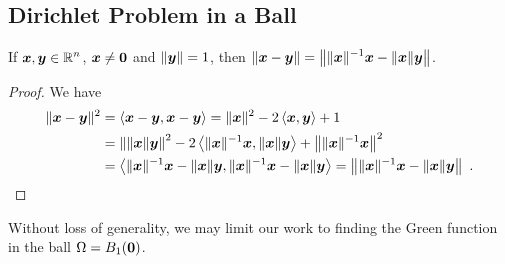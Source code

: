 \subsection{Dirichlet Problem in a Ball}

\begin{lemma} \label{laplace_diric_ball}
If $\displaystyle {\bm{x}}, {\bm{y}} \in \mathbb{R}^n$, ${\bm{x}} \neq {\bm{0}}$ and
$\|{\bm{y}}\|=1$, then
$\displaystyle \|{\bm{x}}-{\bm{y}}\|
= \left\|\|{\bm{x}}\|^{-1} {\bm{x}} - \|{\bm{x}}\| {\bm{y}}\right\|$.
\end{lemma}

\begin{proof}
We have
\begin{align*}
\|{\bm{x}}-{\bm{y}}\|^2 &= \left\langle{{\bm{x}}-{\bm{y}}} , {{\bm{x}}-{\bm{y}}}\right\rangle
= \|{\bm{x}}\|^2 - 2 \left\langle{{\bm{x}}} , {{\bm{y}}}\right\rangle + 1 \\
&= \left\| \|{\bm{x}}\|{\bm{y}}\right\|^2  - 2
\left\langle{\|{\bm{x}}\|^{-1}{\bm{x}}} , {\|{\bm{x}}\|{\bm{y}}}\right\rangle +
\left\|\|{\bm{x}}\|^{-1}{\bm{x}}\right\|^2 \\
&= \left\langle{\|{\bm{x}}\|^{-1} {\bm{x}} - \|{\bm{x}}\|{\bm{y}}} , {\|{\bm{x}}\|^{-1} {\bm{x}} - \|{\bm{x}}\|{\bm{y}}}\right\rangle
= \left\|\|{\bm{x}}\|^{-1} {\bm{x}} - \|{\bm{x}}\|
  {\bm{y}}\right\| \ .  \qedhere
\end{align*}
\end{proof}

Without loss of generality, we may limit our work to finding the Green
function in the ball $\Omega = B_1({\bm{0}})$.


